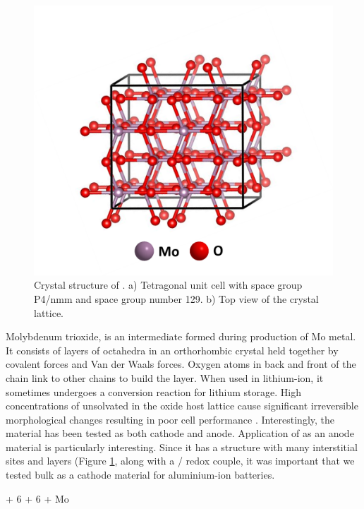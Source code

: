  \begin{figure}[th!]
  \centering
  \includegraphics[width=\textwidth]{Figures/chap6fig/MoO3crys}
    \caption{Crystal structure of . a) Tetragonal unit cell with space group P4/nmm and space group number 129. b) Top view of the crystal lattice.}
  \label{Figures/chap6fig:MoO3crys}
\end{figure}

Molybdenum trioxide,  is an intermediate formed during production of Mo metal. It consists of layers of  octahedra in an orthorhombic crystal held together by covalent forces and Van der Waals forces. Oxygen atoms in back and front of the chain link to other chains to build the layer. When used in lithium-ion, it sometimes undergoes a conversion reaction for lithium storage. High concentrations of unsolvated  in the oxide host lattice cause significant irreversible morphological changes resulting in poor cell performance \cite{tao,li_theore}. Interestingly, the material has been tested as both cathode and anode. Application of  as an anode material is particularly interesting. Since it has a structure with many interstitial sites and layers (Figure \ref{Figures/chap6fig:MoO3crys}, along with a / redox couple, it was important that we tested bulk  as a cathode material for aluminium-ion batteries.

\begin{center}
  + 6 + 6  + Mo   
\end{center}

